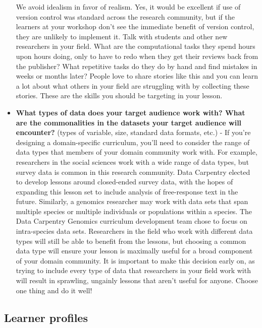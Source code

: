 \documentclass[]{book}
\begin{document}
\begin{itemize}
  We avoid idealism in favor of realism. Yes, it would be excellent if use of version control was standard
  across the research community, but if the learners at your workshop don't see the immediate benefit of version
  control, they are unlikely to implement it. Talk with students and other new researchers in your field. What are
  the computational tasks they spend hours upon hours doing, only to have to redo when they get their reviews
  back from the publisher? What repetitive tasks do they do by hand and find mistakes in weeks or months later?
  People love to share stories like this and you can learn a lot about what others in your field are struggling with
  by collecting these stories. These are the skills you should be targeting in your lesson.
\item
  \textbf{What types of data does your target audience work with? What are the commonalities in the datasets your target audience will encounter?} (types of variable, size, standard data formats, etc.) - If you're designing
  a domain-specific curriculum, you'll need to consider the range of data types that members of your domain
  community work with. For example, researchers in the social sciences work with a wide range of data types, but
  survey data is common in this research community. Data Carpentry elected to develop lessons around closed-ended
  survey data, with the hopes of expanding this lesson set to include analysis of free-response text in the future.
  Similarly, a genomics researcher may work with data sets that span multiple species or multiple individuals or
  populations within a species. The Data Carpentry Genomics curriculum development team chose to focus on
  intra-species data sets. Researchers in the field who work with different data types will still be able to
  benefit from the lessons, but choosing a common data type will ensure your lesson is maximally useful for a broad
  component of your domain community. It is important to make this decision early on, as trying to include every
  type of data that researchers in your field work with will result in sprawling, ungainly lessons that aren't
  useful for anyone. Choose one thing and do it well!
\end{itemize}

\hypertarget{learner-profiles}{%
\subsection{Learner profiles}\label{learner-profiles}}
\end{document}
